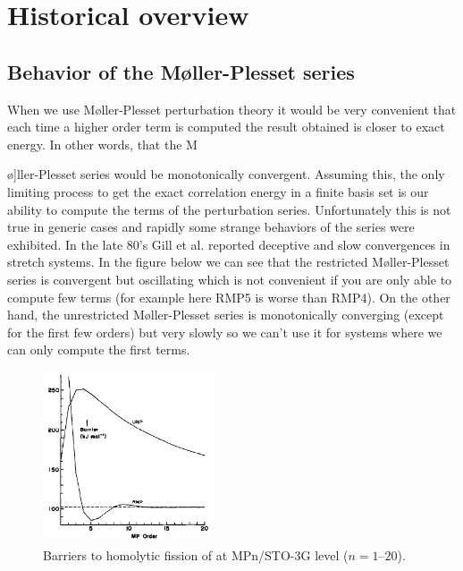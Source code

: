 \documentclass[11pt,a4paper]{article}
\begin{document}
\section{Historical overview}

\subsection{Behavior of the M{\o}ller-Plesset series}

When we use M{\o}ller-Plesset perturbation theory it would be very convenient that each time a higher order term is computed the result obtained is closer to exact energy. In other words, that the M{\o]ller-Plesset series would be monotonically convergent. Assuming this, the only limiting process to get the exact correlation energy in a finite basis set is our ability to compute the terms of the perturbation series.
Unfortunately this is not true in generic cases and rapidly some strange behaviors of the series were exhibited. In the late 80's Gill et al. reported deceptive and slow convergences in stretch systems\cite{Gill_1986, Gill_1988, Handy_1985, Lepetit_1988}. In the figure below we can see that the restricted M{\o}ller-Plesset series is convergent but oscillating which is not convenient if you are only able to compute few terms (for example here RMP5 is worse than RMP4). On the other hand, the unrestricted M{\o}ller-Plesset series is monotonically converging (except for the first few orders) but very slowly so we can't use it for systems where we can only compute the first terms.

\begin{figure}[h!]
    \centering
    \includegraphics[width=0.45\textwidth]{gill1986.png}
    \caption{\centering Barriers to homolytic fission of  at MPn/STO-3G level ($n = 1$--$20$)\cite{Gill_1986}.}
    \label{fig:my_label}
\end{figure}

}
\end{document}
